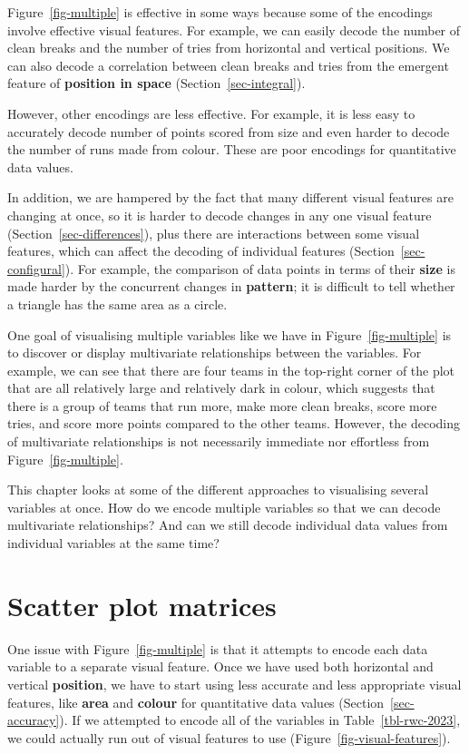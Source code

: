 \documentclass[
  letterpaper,
  DIV=11,
  numbers=noendperiod]{scrreprt}
\begin{document}
Figure~\ref{fig-multiple} is effective in some ways because some of the
encodings involve effective visual features. For example, we can easily
decode the number of clean breaks and the number of tries from
horizontal and vertical positions. We can also decode a correlation
between clean breaks and tries from the emergent feature of
\textbf{position in space} (Section~\ref{sec-integral}).

However, other encodings are less effective. For example, it is less
easy to accurately decode number of points scored from size and even
harder to decode the number of runs made from colour. These are poor
encodings for quantitative data values.

In addition, we are hampered by the fact that many different visual
features are changing at once, so it is harder to decode changes in any
one visual feature (Section~\ref{sec-differences}), plus there are
interactions between some visual features, which can affect the decoding
of individual features (Section~\ref{sec-configural}). For example, the
comparison of data points in terms of their \textbf{size} is made harder
by the concurrent changes in \textbf{pattern}; it is difficult to tell
whether a triangle has the same area as a circle.

One goal of visualising multiple variables like we have in
Figure~\ref{fig-multiple} is to discover or display multivariate
relationships between the variables. For example, we can see that there
are four teams in the top-right corner of the plot that are all
relatively large and relatively dark in colour, which suggests that
there is a group of teams that run more, make more clean breaks, score
more tries, and score more points compared to the other teams. However,
the decoding of multivariate relationships is not necessarily immediate
nor effortless from Figure~\ref{fig-multiple}.

This chapter looks at some of the different approaches to visualising
several variables at once. How do we encode multiple variables so that
we can decode multivariate relationships? And can we still decode
individual data values from individual variables at the same time?

\section{Scatter plot matrices}\label{sec-splom}

One issue with Figure~\ref{fig-multiple} is that it attempts to encode
each data variable to a separate visual feature. Once we have used both
horizontal and vertical \textbf{position}, we have to start using less
accurate and less appropriate visual features, like \textbf{area} and
\textbf{colour} for quantitative data values
(Section~\ref{sec-accuracy}). If we attempted to encode all of the
variables in Table~\ref{tbl-rwc-2023}, we could actually run out of
visual features to use (Figure~\ref{fig-visual-features}).
\end{document}
